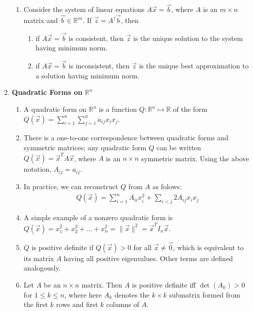 \documentclass[10pt]{article}
\begin{document}
\begin{multicols*}{2}
\begin{enumerate}
\begin{enumerate}
        \item Consider the system of linear equations $A\vec{x} = \vec{b}$, where $A$ is an $m \times n$ matrix and $\vec{b} \in \mathbb{R}^m$. If $\vec{z} = A^\dagger \vec{b}$, then
        \begin{enumerate}
            \item if $A\vec{x} = \vec{b}$ is consistent, then $\vec{z}$ is the unique solution to the system having minimum norm.
            \item if $A\vec{x} = \vec{b}$ is inconsistent, then $\vec{z}$ is the unique best approximation to a solution having minimum norm.
        \end{enumerate}
    \end{enumerate}
    
    \item \textbf{Quadratic Forms on $\mathbb{R}^n$}
    \begin{enumerate}
        \item A quadratic form on $\mathbb{R}^n$ is a function $Q: \mathbb{R}^n \mapsto \mathbb{R}$ of the form $Q(\vec{x}) = \sum_{i=1}^n \sum_{j=1}^n a_{ij} x_ix_j$.
        \item There is a one-to-one correspondence between quadratic forms and symmetric matrices; any quadratic form $Q$ can be written $Q(\vec{x}) = \vec{x}^T A\vec{x}$, where $A$ is an $n \times n$ symmetric matrix. Using the above notation, $A_{ij} = a_{ij}$. 
        \item In practice, we can reconstruct $Q$ from $A$ as folows:
        \begin{align*}
            Q(\vec{x}) = \sum_{i=1}^n A_{ii}x_i^2 + \sum_{i < j} 2A_{ij}x_ix_j
        \end{align*} 
        
        \item A simple example of a nonzero quadratic form is $Q(\vec{x}) = x_1^2 + x_2^2 + \hdots + x_n^2 = \|\vec{x}\|^2 = \vec{x}^T I_n \vec{x}$.
        
        \item $Q$ is positive definite if $Q(\vec{x}) > 0$ for all $\vec{x} \neq \vec{0}$, which is equivalent to its matrix $A$ having all positive eigenvalues. Other terms are defined analogously.
        \item Let $A$ be an $n \times n$ matrix. Then $A$ is positive definite iff $\det(A_k) > 0$ for $1 \leq k \leq n$, where here $A_k$ denotes the $k \times k$ submatrix formed from the first $k$ rows and first $k$ columns of $A$.
        

\end{enumerate}
\end{enumerate}
\end{multicols*}
\end{document}
